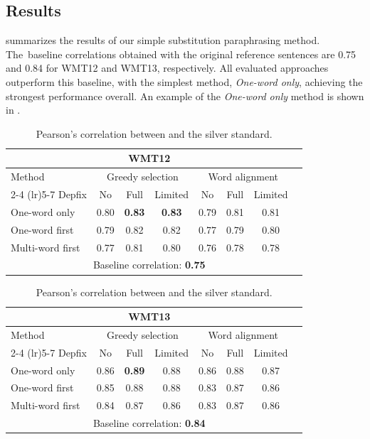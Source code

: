 \subsection{Results}
\label{substitution_results}

 summarizes the results of our simple substitution paraphrasing method. The~baseline correlations obtained with the original reference sentences are 0.75 and 0.84 for WMT12 and WMT13, respectively. All evaluated approaches outperform this baseline, with the simplest method, \emph{One-word only}, achieving the strongest performance overall. An example of the \emph{One-word only} method is shown in . 

\begin{table}[H]
\centering
\begin{tabular}{lccccccc}
\multicolumn{7}{c}{\textbf{WMT12}} \\
\toprule
Method & \multicolumn{3}{c}{Greedy selection} & \multicolumn{3}{c}{Word alignment} \\
\cmidrule(lr){2-4} \cmidrule(lr){5-7}
Depfix & No  & Full  & Limited & No  & Full  & Limited \\
\midrule
One-word only     & 0.80 & \textbf{0.83} & \textbf{0.83} & 0.79 & 0.81 & 0.81 \\
One-word first    & 0.79 & 0.82 & 0.82 & 0.77 & 0.79 & 0.80 \\
Multi-word first  & 0.77 & 0.81 & 0.80 & 0.76 & 0.78 & 0.78 \\
\midrule
\multicolumn{7}{c}{Baseline correlation: \textbf{0.75}} \\
\bottomrule
\end{tabular}

\begin{tabular}{lccccccc}
\multicolumn{7}{c}{\textbf{WMT13}} \\
\toprule
Method & \multicolumn{3}{c}{Greedy selection} & \multicolumn{3}{c}{Word alignment} \\
\cmidrule(lr){2-4} \cmidrule(lr){5-7}
Depfix & No  & Full  & Limited & No  & Full  & Limited \\
\midrule
One-word only     & 0.86 & \textbf{0.89} & 0.88 & 0.86 & 0.88 & 0.87 \\
One-word first    & 0.85 & 0.88 & 0.88 & 0.83 & 0.87 & 0.86 \\
Multi-word first  & 0.84 & 0.87 & 0.86 & 0.83 & 0.87 & 0.86 \\
\midrule
\multicolumn{7}{c}{Baseline correlation: \textbf{0.84}} \\
\bottomrule
\end{tabular}

\caption{Pearson's correlation between \bleu and the silver standard.}
\label{corrs:12:13}
\end{table}

